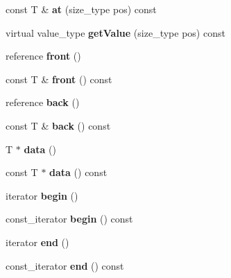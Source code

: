 \begin{DoxyCompactItemize}
\mbox{\label{classdsp_1_1_signal_ac1799c5e25b4d0451bd0ff1b9b0a1263}} 
const T \& {\bfseries at} (size\+\_\+type pos) const
\item 
\mbox{\label{classdsp_1_1_signal_af766c6a8e02ae9231c489c45246c5672}} 
virtual value\+\_\+type {\bfseries get\+Value} (size\+\_\+type pos) const
\item 
\mbox{\label{classdsp_1_1_signal_afe2ab6c9c5c6f33e4eac1d0c04028c58}} 
reference {\bfseries front} ()
\item 
\mbox{\label{classdsp_1_1_signal_a18821f0fa5f02811c6221656f5f18690}} 
const T \& {\bfseries front} () const
\item 
\mbox{\label{classdsp_1_1_signal_aca085c566f9accec8f2a290ae2050529}} 
reference {\bfseries back} ()
\item 
\mbox{\label{classdsp_1_1_signal_ac7e75bfe2fdc96d634857cdb94f31aaa}} 
const T \& {\bfseries back} () const
\item 
\mbox{\label{classdsp_1_1_signal_af6b5071ef11ff611236dd7d9f95564b0}} 
T $\ast$ {\bfseries data} ()
\item 
\mbox{\label{classdsp_1_1_signal_aaa737bc882d6a8826965c234ed520d07}} 
const T $\ast$ {\bfseries data} () const
\item 
\mbox{\label{classdsp_1_1_signal_a1018d1f48d1ca06232b11a63876a4f04}} 
iterator {\bfseries begin} ()
\item 
\mbox{\label{classdsp_1_1_signal_a674409181f8490a98e7b636df6cd82df}} 
const\+\_\+iterator {\bfseries begin} () const
\item 
\mbox{\label{classdsp_1_1_signal_aefd89e6f0ab6cc1e27f276ae0c7bb9a6}} 
iterator {\bfseries end} ()
\item 
\mbox{\label{classdsp_1_1_signal_a82980453369e8a7ebc4fdcef4c9e38f3}} 
const\+\_\+iterator {\bfseries end} () const

\end{DoxyCompactItemize}
